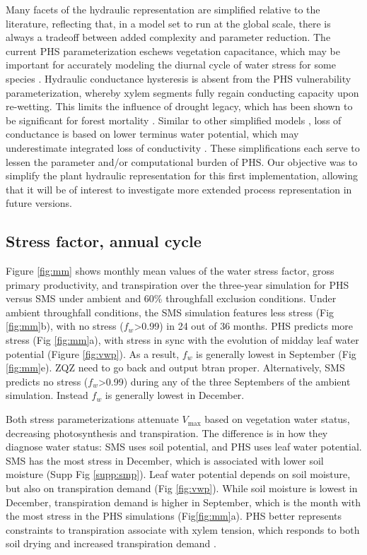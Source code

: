 \documentclass[draft,linenumbers]{agujournal}
\begin{document}
    Many facets of the hydraulic representation are simplified relative to the literature, reflecting that, in a model set to run at the global scale, 
    there is always a tradeoff between added complexity and parameter reduction.
    The current PHS parameterization eschews vegetation capacitance, 
    which may be important for accurately modeling the diurnal cycle of water stress for some species \citep{meinzer2009}.
    Hydraulic conductance hysteresis is absent from the PHS vulnerability parameterization, 
    whereby xylem segments fully regain conducting capacity upon re-wetting.
    This limits the influence of drought legacy, which has been shown to be significant for forest mortality \citep{anderegg2013}.
    Similar to other simplified models \citep{xu2016}, loss of conductance is based on lower terminus water potential, 
    which may underestimate integrated loss of conductivity \citep{sperry2015}.
    These simplifications each serve to lessen the parameter and/or computational burden of PHS.
    Our objective was to simplify the plant hydraulic representation for this first implementation, 
    allowing that it will be of interest to investigate more extended process representation in future versions.

\subsection{Stress factor, annual cycle}

Figure \ref{fig:mm} shows monthly mean values of the water stress factor, gross primary productivity, and transpiration
over the three-year simulation for PHS versus SMS under ambient and 60\% throughfall exclusion conditions.
Under ambient throughfall conditions, the SMS simulation features less stress (Fig \ref{fig:mm}b), with
no stress ($f_w$>0.99) in 24 out of 36 months.
PHS predicts more stress (Fig \ref{fig:mm}a), with stress in sync with the evolution of midday leaf water potential (Figure \ref{fig:vwp}).
As a result, $f_w$ is generally lowest in September (Fig \ref{fig:mm}e). ZQZ need to go back and output btran proper.
Alternatively, SMS predicts no stress ($f_w$>0.99) during any of the three Septembers of the ambient simulation.
Instead $f_w$ is generally lowest in December.

Both stress parameterizations attenuate $V_{\text{max}}$ based on vegetation water status, decreasing photosynthesis and transpiration.
The difference is in how they diagnose water status: SMS uses soil potential, and PHS uses leaf water potential.
SMS has the most stress in December, which is associated with lower soil moisture (Supp Fig \ref{supp:smp}).
Leaf water potential depends on soil moisture, but also on transpiration demand (Fig \ref{fig:vwp}).
While soil moisture is lowest in December, transpiration demand is higher in September,
which is the month with the most stress in the PHS simulations (Fig\ref{fig:mm}a).
PHS better represents constraints to transpiration associate with xylem tension, which responds to both soil drying and increased transpiration demand \citep{sperry2015}.
\end{document}
